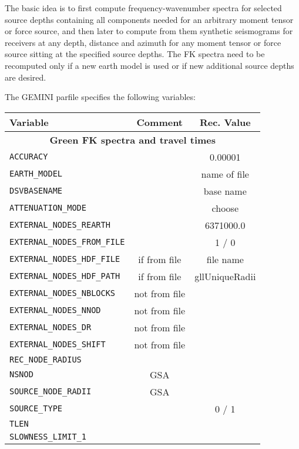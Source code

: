 The basic idea is to first compute frequency-wavenumber spectra for selected source depths containing all components needed for an arbitrary moment tensor or force source, and then later to compute from them synthetic seismograms for receivers at any depth, distance and azimuth for any moment tensor or force source sitting at the specified source depths. The FK spectra need to be recomputed only if a new earth model is used or if new additional source depths are desired.

The GEMINI parfile specifies the following variables:
\begin{longtable}{|p{6.5cm}|c|c|}\hline
	Variable & Comment & Rec. Value \\ \hline
   \multicolumn{3}{|c|}{\textbf{Green FK spectra and travel times}}  \\ \hline
	\verb+ACCURACY+                  & & 0.00001 \\ \hline
	\verb+EARTH_MODEL+               & & name of file \\ \hline
	\verb+DSVBASENAME+               & & base name \\ \hline
	\verb+ATTENUATION_MODE+          & & choose \\ \hline
	\verb+EXTERNAL_NODES_REARTH+     & & 6371000.0 \\ \hline
	\verb+EXTERNAL_NODES_FROM_FILE+  & & 1 / 0 \\ \hline
	\verb+EXTERNAL_NODES_HDF_FILE+   & if from file & file name \\ \hline
	\verb+EXTERNAL_NODES_HDF_PATH+   & if from file & gllUniqueRadii \\ \hline
	\verb+EXTERNAL_NODES_NBLOCKS+    & not from file &  \\ \hline
	\verb+EXTERNAL_NODES_NNOD+       & not from file &  \\ \hline
	\verb+EXTERNAL_NODES_DR+         & not from file &  \\ \hline
	\verb+EXTERNAL_NODES_SHIFT+      & not from file &  \\ \hline
	\verb+REC_NODE_RADIUS+           & &  \\ \hline
	\verb+NSNOD+                     & GSA &  \\ \hline
	\verb+SOURCE_NODE_RADII+         & GSA &  \\ \hline
	\verb+SOURCE_TYPE+               & & 0 / 1 \\ \hline
	\verb+TLEN+                      & &  \\ \hline
   \verb+SLOWNESS_LIMIT_1+          & &  \\ \hline

\end{longtable}
